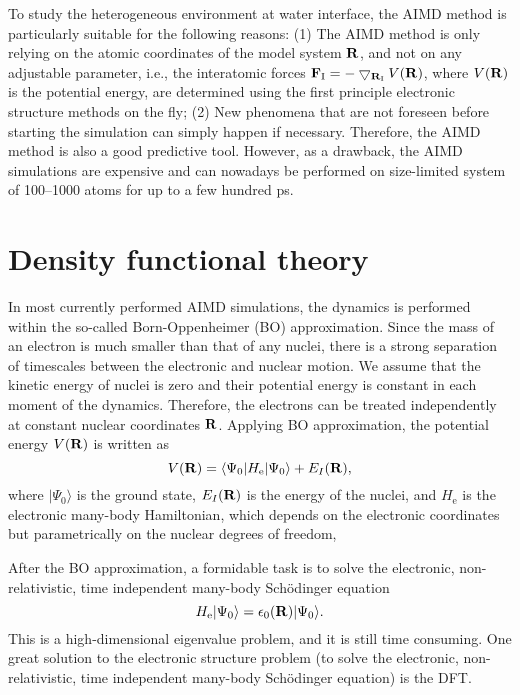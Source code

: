 To study the heterogeneous environment at water interface, the AIMD method is particularly suitable for the following reasons:
(1) The AIMD method is only relying on the atomic coordinates of the model system $\bf R$, and not on any adjustable parameter, 
i.e., the interatomic forces ${\bf F}_{\text{I}}=-\bigtriangledown_{{\bf R}_{\text{I}}}V({\bf R})$, where $V({\bf R})$ is the potential energy\cite{VKMP},
are determined using the first principle electronic structure methods on the fly; 
(2) New phenomena that are not foreseen before starting the simulation can simply happen if necessary.
Therefore, the AIMD method is also a good predictive tool. 
However, as a drawback, the AIMD simulations are expensive and can nowadays be performed on size-limited system of 100--1000 atoms for up to a few hundred ps. 

\section{Density functional theory} \label{section_DFT}
In most currently performed AIMD simulations, the dynamics is performed within the so-called Born-Oppenheimer (BO) approximation.
Since the mass of an electron is much smaller than that of any nuclei, there is a strong separation of timescales between the electronic and nuclear motion. 
We assume that the kinetic energy of nuclei is zero and their potential energy is constant in each moment of the dynamics.
Therefore, the electrons can be treated independently at constant nuclear coordinates $\bf R$.
Applying BO approximation, the potential energy $V(\bf R)$ is  written as
\begin{equation}
  V({\bf R})=\langle \Psi_0 | H_{\text{e}} | \Psi_0 \rangle + E_{I}({\bf R}),
\label{eq:BO}
\end{equation}
where $|\Psi_0\rangle$ is the ground state, 
$E_I({\bf R})$ is the energy of the nuclei,
and $H_{\text{e}}$ is the electronic many-body Hamiltonian, which depends on the electronic 
coordinates but parametrically on the nuclear degrees of freedom, 

After the BO approximation, a formidable task is to solve the electronic, non-relativistic, time independent many-body Sch\"{o}dinger equation
\begin{equation}
H_{\text{e}} |\Psi_0 \rangle = \epsilon_0({\bf R})|\Psi_0 \rangle.
\label{eq:SE}
\end{equation}
This is a high-dimensional eigenvalue problem, and it is still time consuming. 
One great solution to the electronic structure problem (to solve the electronic, non-relativistic, time independent many-body 
Sch\"{o}dinger equation) is the DFT\cite{HK64,KS65}.

